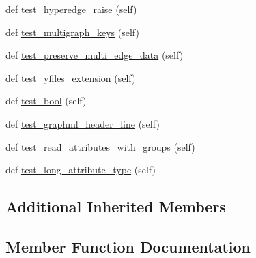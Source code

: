 \begin{DoxyCompactItemize}
\item 
def \hyperlink{classnetworkx_1_1readwrite_1_1tests_1_1test__graphml_1_1TestReadGraphML_a68a9852f800554868475a6e8c710c5ab}{test\+\_\+hyperedge\+\_\+raise} (self)
\item 
def \hyperlink{classnetworkx_1_1readwrite_1_1tests_1_1test__graphml_1_1TestReadGraphML_ada3dcbffc04a25b169312d3f932737d7}{test\+\_\+multigraph\+\_\+keys} (self)
\item 
def \hyperlink{classnetworkx_1_1readwrite_1_1tests_1_1test__graphml_1_1TestReadGraphML_ab737bb593357b6e7be8ba202463f1fc1}{test\+\_\+preserve\+\_\+multi\+\_\+edge\+\_\+data} (self)
\item 
def \hyperlink{classnetworkx_1_1readwrite_1_1tests_1_1test__graphml_1_1TestReadGraphML_abf4e2b3d695db159d554f99ae36b144d}{test\+\_\+yfiles\+\_\+extension} (self)
\item 
def \hyperlink{classnetworkx_1_1readwrite_1_1tests_1_1test__graphml_1_1TestReadGraphML_ada2072429a938602091a42ecf896ee19}{test\+\_\+bool} (self)
\item 
def \hyperlink{classnetworkx_1_1readwrite_1_1tests_1_1test__graphml_1_1TestReadGraphML_aa9c6dc2ed307d950818833b598b20724}{test\+\_\+graphml\+\_\+header\+\_\+line} (self)
\item 
def \hyperlink{classnetworkx_1_1readwrite_1_1tests_1_1test__graphml_1_1TestReadGraphML_af81701bbeb919064c9a89e81d3cee1ec}{test\+\_\+read\+\_\+attributes\+\_\+with\+\_\+groups} (self)
\item 
def \hyperlink{classnetworkx_1_1readwrite_1_1tests_1_1test__graphml_1_1TestReadGraphML_acb04d6661e99ec29556c0ce104b5854b}{test\+\_\+long\+\_\+attribute\+\_\+type} (self)
\end{DoxyCompactItemize}
\subsection*{Additional Inherited Members}


\subsection{Member Function Documentation}
\mbox{\label{classnetworkx_1_1readwrite_1_1tests_1_1test__graphml_1_1TestReadGraphML_ada2072429a938602091a42ecf896ee19}} 
